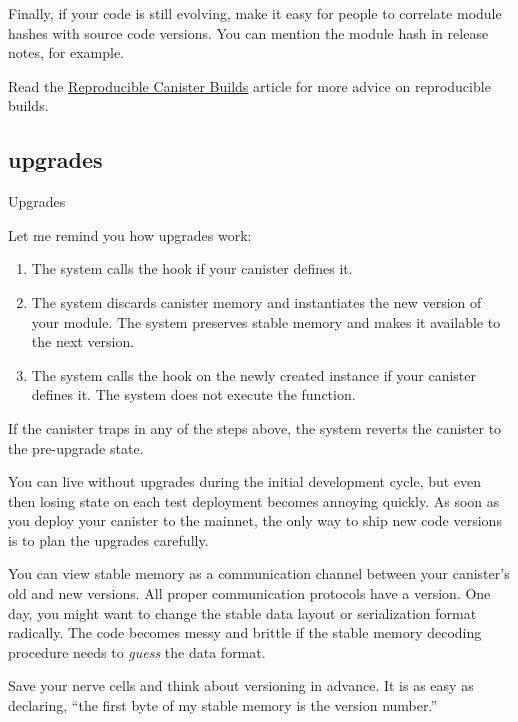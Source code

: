 \documentclass{article}
\begin{document}
Finally, if your code is still evolving, make it easy for people to correlate module hashes with source code versions.
You can mention the module hash in release notes, for example.

Read the \href{https://smartcontracts.org/docs/developers-guide/tutorials/reproducible-builds.html}{Reproducible Canister Builds} article for more advice on reproducible builds.

\subsection{upgrades}{Upgrades}

Let me remind you how upgrades work:
\begin{enumerate}
\item The system calls the  hook if your canister defines it.
\item
  The system discards canister memory and instantiates the new version of your module.
  The system preserves stable memory and makes it available to the next version.
\item
  The system calls the  hook on the newly created instance if your canister defines it.
  The system does not execute the  function.
\end{enumerate}

If the canister traps in any of the steps above, the system reverts the canister to the pre-upgrade state.


You can live without upgrades during the initial development cycle, but even then losing state on each test deployment becomes annoying quickly.
As soon as you deploy your canister to the mainnet, the only way to ship new code versions is to plan the upgrades carefully.


You can view stable memory as a communication channel between your canister's old and new versions.
All proper communication protocols have a version.
One day, you might want to change the stable data layout or serialization format radically.
The code becomes messy and brittle if the stable memory decoding procedure needs to \emph{guess} the data format.

Save your nerve cells and think about versioning in advance.
It is as easy as declaring, ``the first byte of my stable memory is the version number.''
\end{document}
